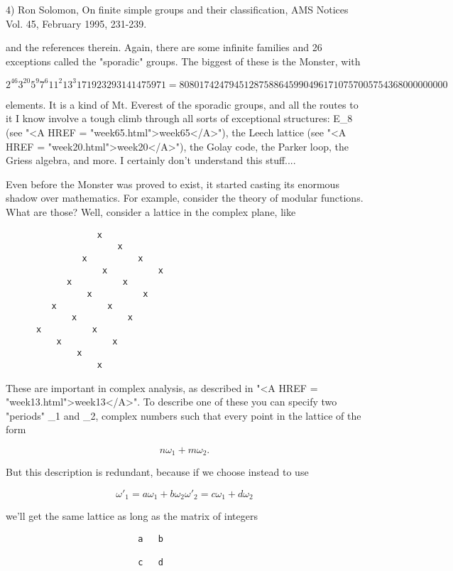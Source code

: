 4) Ron Solomon, On finite simple groups and their classification, AMS
Notices Vol. 45, February 1995, 231-239.

and the references therein.  Again, there are some infinite families and
26 exceptions called the "sporadic" groups.  The biggest of these
is the Monster, with 

$$
 2^{46} 3^{20} 5^{9} 7^{6} 11^{2} 13^{3} 17 19 23 29 31 41 47 59 71  = 
 808017424794512875886459904961710757005754368000000000
$$
    

elements.  It is a kind of Mt. Everest of the sporadic groups, and all
the routes to it I know involve a tough climb through all sorts of
exceptional structures: E_{8} (see "<A HREF =
"week65.html">week65</A>"), the Leech lattice (see "<A HREF =
"week20.html">week20</A>"), the Golay code, the Parker loop, the
Griess algebra, and more.  I certainly don't understand this stuff....

Even before the Monster was proved to exist, it started casting its
enormous shadow over mathematics.  For example, consider the theory
of modular functions.  What are those?  Well, consider a lattice in the
complex plane, like 


\begin{verbatim}
                  x
                      x
               x          x
                   x          x 
            x          x
                x          x
         x          x
             x          x
      x          x   
          x          x
              x 
                  x
\end{verbatim}
    

These are important in complex analysis, as described in "<A HREF =
"week13.html">week13</A>".  To describe one of these you can specify
two "periods" \omega _{1} and \omega _{2}, complex numbers
such that every point in the lattice of the form

$$
                   n \omega _{1} + m \omega _{2}.
$$
    

But this description is redundant, because if we choose instead to
use

$$
                 \omega '_{1} = a \omega _{1} + b \omega _{2}

                 \omega '_{2} = c \omega _{1} + d \omega _{2}
$$
    
we'll get the same lattice as long as the matrix of integers
\begin{verbatim}
                          a   b 

                          c   d
\end{verbatim}
    

